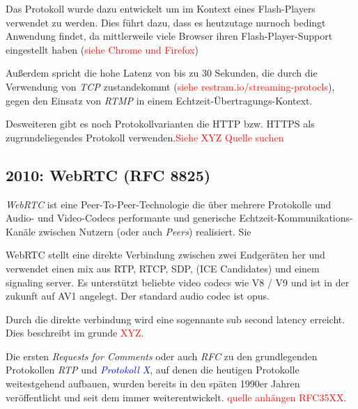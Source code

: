 \documentclass[journal]{IEEEtran}
\begin{document}
\begin{twocolumn}
Das Protokoll wurde dazu entwickelt um im Kontext eines Flash-Players verwendet
zu werden. Dies führt dazu, dass es heutzutage nurnoch bedingt Anwendung
findet, da mittlerweile viele Browser ihren Flash-Player-Support eingestellt
haben (\textcolor{red}{siehe Chrome und Firefox}) %

Außerdem spricht die hohe Latenz von bis zu 30 Sekunden, die durch die
Verwendung von \textit{TCP} zustandekommt (\textcolor{red}{siehe
restram.io/streaming-protocls}), gegen den Einsatz von \textit{RTMP} in einem
Echtzeit-Übertragungs-Kontext.

Desweiteren gibt es noch Protokollvarianten die HTTP bzw. HTTPS als zugrundeliegendes
Protokoll verwenden.\textcolor{red}{Siehe XYZ Quelle suchen}

\subsection{2010: WebRTC (RFC 8825)}

\textit{WebRTC} ist eine Peer-To-Peer-Technologie die über mehrere Protokolle
und Audio- und Video-Codecs performante und generische
Echtzeit-Kommunikations-Kanäle zwischen Nutzern (oder auch \textit{Peers})
realisiert. Sie 

WebRTC stellt eine direkte Verbindung zwischen zwei Endgeräten her und
verwendet einen mix aus RTP, RTCP, SDP, (ICE Candidates) und einem signaling
server. Es unterstützt beliebte video codecs wie V8 / V9 und ist in der zukunft 
auf AV1 angelegt. Der standard audio codec ist opus.

Durch die direkte verbindung wird eine sogennante sub second latency erreicht.
Dies beschreibt im grunde \textcolor{red}{XYZ}.





Die ersten \textit{Requests for Comments} oder auch \textit{RFC} zu
den grundlegenden Protokollen \textit{RTP} und
\textit{\textcolor{blue}{Protokoll X}}, auf denen die heutigen Protokolle
weitestgehend aufbauen, wurden bereits in den späten 1990er Jahren
veröffentlicht und seit dem immer weiterentwickelt. \textcolor{red}{quelle
anhängen RFC35XX}.


\end{twocolumn}
\end{document}
